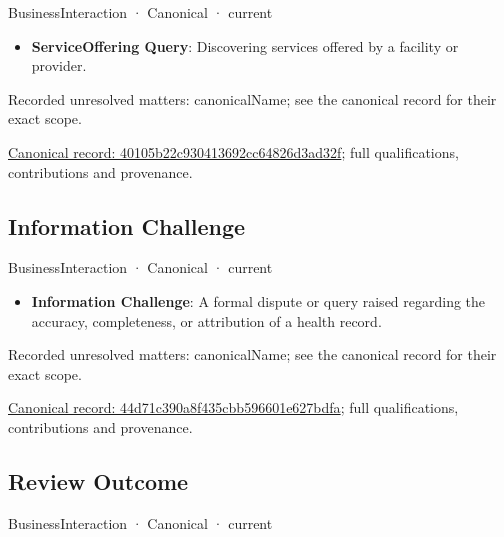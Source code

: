 \label{element:40105b22c930413692cc64826d3ad32f}
{\small BusinessInteraction · Canonical · current}\par

\begin{itemize}


\item \textbf{ServiceOffering Query}: Discovering services offered by a facility or provider.

\end{itemize}

{\small Recorded unresolved matters: canonicalName; see the canonical record for their exact scope.}\par
{\footnotesize \href{../../../../continuum/business/business-interaction/40105b22c930413692cc64826d3ad32f.md}{Canonical record: 40105b22c930413692cc64826d3ad32f}; full qualifications, contributions and provenance.}\par
\subsection{Information Challenge}

\label{element:44d71c390a8f435cbb596601e627bdfa}
{\small BusinessInteraction · Canonical · current}\par

\begin{itemize}


\item \textbf{Information Challenge}: A formal dispute or query raised regarding the accuracy, completeness, or attribution of a health record.

\end{itemize}

{\small Recorded unresolved matters: canonicalName; see the canonical record for their exact scope.}\par
{\footnotesize \href{../../../../continuum/business/business-interaction/44d71c390a8f435cbb596601e627bdfa.md}{Canonical record: 44d71c390a8f435cbb596601e627bdfa}; full qualifications, contributions and provenance.}\par
\subsection{Review Outcome}

\label{element:45bf28eb44e64554b568db48a30ac43c}
{\small BusinessInteraction · Canonical · current}\par


